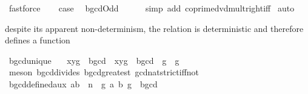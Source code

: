 \begin{isabellebody}
\ fastforce\isanewline
\ \ \isamarkupfalse%
\ {\isacharquery}{\kern0pt}case\ \isamarkupfalse%
\ bgcdOdd\isanewline
\ \ \ \ \isamarkupfalse%
\ {\isacharparenleft}{\kern0pt}simp\ add{\isacharcolon}{\kern0pt}\ coprime{\isacharunderscore}{\kern0pt}dvd{\isacharunderscore}{\kern0pt}mult{\isacharunderscore}{\kern0pt}right{\isacharunderscore}{\kern0pt}iff{\isacharparenright}{\kern0pt}\isanewline
{}\isamarkupfalse%
\ auto%
\endisatagproof
{\isafoldproof}%
%
\isadelimproof
%
\endisadelimproof
%
\isadelimdocument
%
\endisadelimdocument
%
\isatagdocument
%
\isamarkuptrue%
%
\endisatagdocument
{\isafolddocument}%
%
\isadelimdocument
%
\endisadelimdocument
%
\begin{isamarkuptext}%
despite its apparent non-determinism, the relation  is deterministic 
  and therefore defines a function%
\end{isamarkuptext}\isamarkuptrue%
\isamarkupfalse%
\ bgcd{\isacharunderscore}{\kern0pt}unique{\isacharcolon}{\kern0pt}\ \isanewline
\ \ {\isachardoublequoteopen}{\isacharparenleft}{\kern0pt}x{\isacharcomma}{\kern0pt}y{\isacharcomma}{\kern0pt}g{\isacharparenright}{\kern0pt}\ {\isasymin}\ bgcd\ {\isasymLongrightarrow}\ {\isacharparenleft}{\kern0pt}x{\isacharcomma}{\kern0pt}y{\isacharcomma}{\kern0pt}g{\isacharprime}{\kern0pt}{\isacharparenright}{\kern0pt}\ {\isasymin}\ bgcd\ {\isasymLongrightarrow}\ g\ {\isacharequal}{\kern0pt}\ g{\isacharprime}{\kern0pt}{\isachardoublequoteclose}\isanewline
%
\isadelimproof
\ \ %
\endisadelimproof
%
\isatagproof
{}\isamarkupfalse%
\ {\isacharparenleft}{\kern0pt}meson\ bgcd{\isacharunderscore}{\kern0pt}divides\ bgcd{\isacharunderscore}{\kern0pt}greatest\ gcd{\isacharunderscore}{\kern0pt}nat{\isachardot}{\kern0pt}strict{\isacharunderscore}{\kern0pt}iff{\isacharunderscore}{\kern0pt}not{\isacharparenright}{\kern0pt}%
\endisatagproof
{\isafoldproof}%
%
\isadelimproof
\isanewline
%
\endisadelimproof
\isanewline
{}\isamarkupfalse%
\ bgcd{\isacharunderscore}{\kern0pt}defined{\isacharunderscore}{\kern0pt}aux{\isacharcolon}{\kern0pt}\ {\isachardoublequoteopen}a{\isacharplus}{\kern0pt}b\ {\isasymle}\ n\ {\isasymLongrightarrow}\ {\isasymexists}g{\isachardot}{\kern0pt}\ {\isacharparenleft}{\kern0pt}a{\isacharcomma}{\kern0pt}\ b{\isacharcomma}{\kern0pt}\ g{\isacharparenright}{\kern0pt}\ {\isasymin}\ bgcd{\isachardoublequoteclose}\isanewline
%
\isadelimproof
%
\endisadelimproof
%
\isatagproof
{}\isamarkupfalse%

\end{isabellebody}

